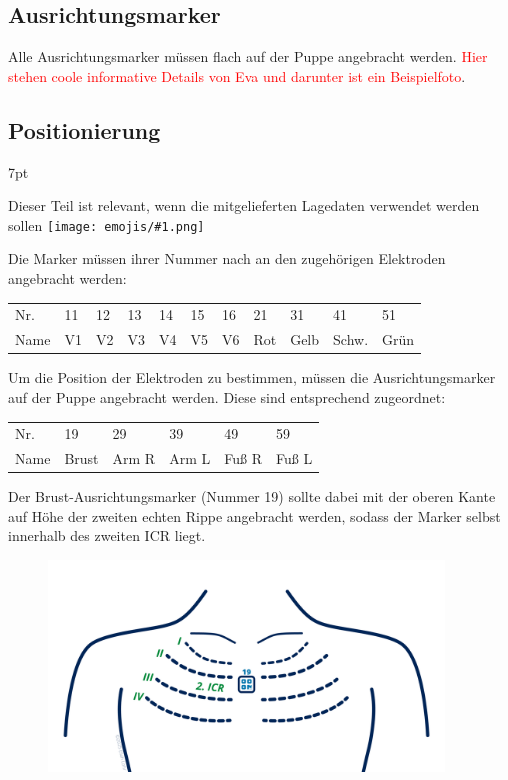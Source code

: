 \documentclass[a4paper, 10pt]{article}
\newcommand{\warn}[1]{\textcolor{red}{#1}}
\newcommand{\emoji}[1]{
    \begingroup\normalfont
    \texttt{[image: emojis/\#1.png]}
    \endgroup
}
\newenvironment{formal}{%
\small
\vspace*{-4mm}
    \def\FrameCommand{%
    \hspace{1pt}%
    {\color{formalpipe}\vrule width 0.7mm}%
    {\color{formalshade}\vrule width 1.5mm}%
    \colorbox{formalshade}%
    }%
    \MakeFramed{\advance\hsize-\width\FrameRestore}%
    \noindent%
    \begin{adjustwidth}{}{7pt}%
    \vspace{2pt}\vspace{2pt}%
}
{%
    \vspace{2pt}\end{adjustwidth}\endMakeFramed%
}
\begin{document}
\subsection{Ausrichtungsmarker}
\label{ssec:reference-markers}
Alle Ausrichtungsmarker müssen flach auf der Puppe angebracht werden. \warn{Hier stehen coole informative Details von Eva und darunter ist ein Beispielfoto}.

\subsection{Positionierung}
\label{sssec:marker-positioning}
\begin{formal}
    Dieser Teil ist relevant, wenn die mitgelieferten Lagedaten verwendet werden sollen\emoji{package}
\end{formal}

Die Marker müssen ihrer Nummer nach an den zugehörigen Elektroden angebracht werden:
\begin{table}[H]
    \centering
    \begin{tabular}{p{11mm}| p{9.5mm} p{9.5mm} p{9.5mm} p{9.5mm} p{9.5mm} p{9.5mm} p{9.5mm} p{9.5mm} p{9.5mm} p{9.5mm}}
        Nr.  & 11  & 12  & 13  & 14 & 15 & 16 & 21 & 31 & 41  & 51 \\
        Name & V1  & V2  & V3  & V4 & V5 & V6 & Rot & Gelb & Schw. & Grün \\
    \end{tabular}
\end{table}

\noindent Um die Position der Elektroden zu bestimmen, müssen die Ausrichtungsmarker auf der Puppe angebracht werden. Diese sind entsprechend zugeordnet:
\begin{table}[H]
    \centering
    \begin{tabular}{p{10.5mm}| p{10.5mm} p{10.5mm} p{10.5mm} p{10.5mm} p{10.5mm}}
        Nr.  & 19    & 29    & 39    & 49    & 59 \\
        Name & Brust & Arm R & Arm L & Fuß R & Fuß L \\
    \end{tabular}
\end{table}

Der Brust-Ausrichtungsmarker (Nummer 19) sollte dabei mit der oberen Kante auf Höhe der zweiten echten Rippe angebracht werden, sodass der Marker selbst innerhalb des zweiten ICR liegt.
\begin{figure}[H]
    \centering
    \includegraphics[width=10.5cm]{placement-torso.png}\\
\end{figure}
\end{document}
